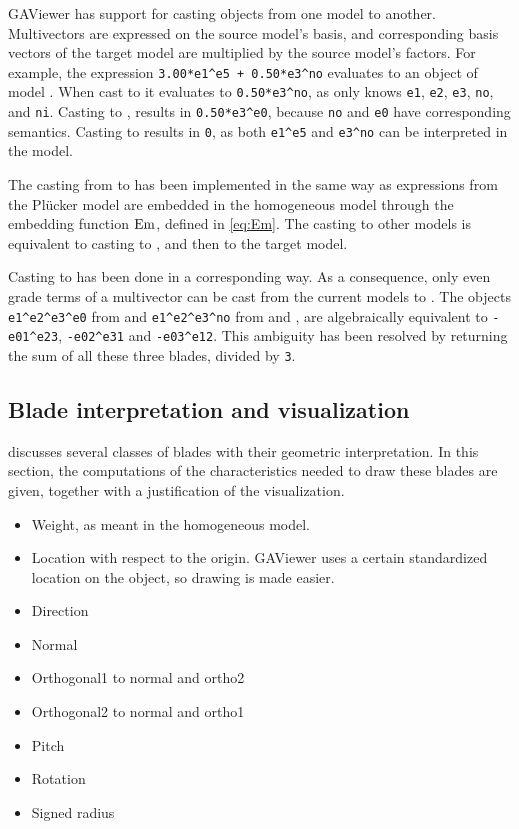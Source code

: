 GAViewer has support for casting objects from one model to another.  Multivectors are expressed on the source model's basis, and corresponding basis vectors of the target model are multiplied by the source model's factors.  For example, the expression \texttt{3.00*e1\^{}e5 + 0.50*e3\^{}no} evaluates to an object of model \cbga{}.  When cast to \cga{} it evaluates to \texttt{0.50*e3\^{}no}, as \cga{} only knows \texttt{e1}, \texttt{e2}, \texttt{e3}, \texttt{no}, and \texttt{ni}.  Casting to \pga{}, results in \texttt{0.50*e3\^{}e0}, because \texttt{no} and \texttt{e0} have corresponding semantics.  Casting to \ega{} results in \texttt{0}, as both \texttt{e1\^{}e5} and \texttt{e3\^{}no} can be interpreted in the model.

The casting from \lga{} to \pga{} has been implemented in the same way as expressions from the Pl\"ucker model are embedded in the homogeneous model through the embedding function $\operatorname{Em}$, defined in \autoref{eq:Em}.  The casting to other models is equivalent to casting to \pga{}, and then to the target model.

Casting to \lga{} has been done in a corresponding way.  As a consequence, only even grade terms of a multivector can be cast from the current models to \lga{}.  The objects \texttt{e1\^{}e2\^{}e3\^{}e0} from \pga{} and \texttt{e1\^{}e2\^{}e3\^{}no} from \cga{} and \cbga{}, are algebraically equivalent to \texttt{-e01\^{}e23}, \texttt{-e02\^{}e31} and \texttt{-e03\^{}e12}.  This ambiguity has been resolved by returning the sum of all these three blades, divided by \texttt{3}.

\subsection{Blade interpretation and visualization}
 discusses several classes of blades with their geometric interpretation.  In this section, the computations of the characteristics needed to draw these blades are given, together with a justification of the visualization.

\begin{itemize}
  \item Weight, as meant in the homogeneous model.
  \item Location with respect to the origin.  GAViewer uses a certain standardized location on the object, so drawing is made easier.
  \item Direction
  \item Normal
  \item Orthogonal1 to normal and ortho2
  \item Orthogonal2 to normal and ortho1
  \item Pitch
  \item Rotation
  \item Signed radius
\end{itemize}


